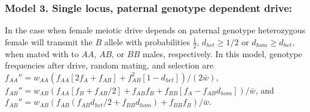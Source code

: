 \documentclass[12pt,letterpaper]{article}
\begin{document}
\subsubsection*{Model 3. Single locus, paternal genotype dependent drive:}
In the case when female meiotic drive depends on paternal genotype
 heterozygous female will transmit the $B$ allele 
  with probabilities  $\frac{1}{2}$,  $d_{het}\geq 1/2 $ or $d_{hom}\geq d_{het}$, 
 when mated with to $AA$, $AB$, or $BB$ males,  respectively. 
  In this model, genotype frequencies after drive, random mating, and selection are 
  	$f_{AA}'' =   w_{AA}\left( f_{AA} [2 f_A + f_{AB} ] + f_{AB}^2 [1 - d_{het}] \right)/(2\bar{w})$,
	$f_{AB}'' =   w_{AB}(f_{AA} [f_B + f_{AB}/2] + f_{AB} f_B + f_{BB} [ f_A - f_{AB} d_{hom}])/\bar{w}$, 
	and 	$f_{AB}'' =   w_{AB}(f_{AB} (f_{AB} d_{het}/2 + f_{BB} d_{hom}) + f_{BB} f_B)/\bar{w}$. 
\end{document}

